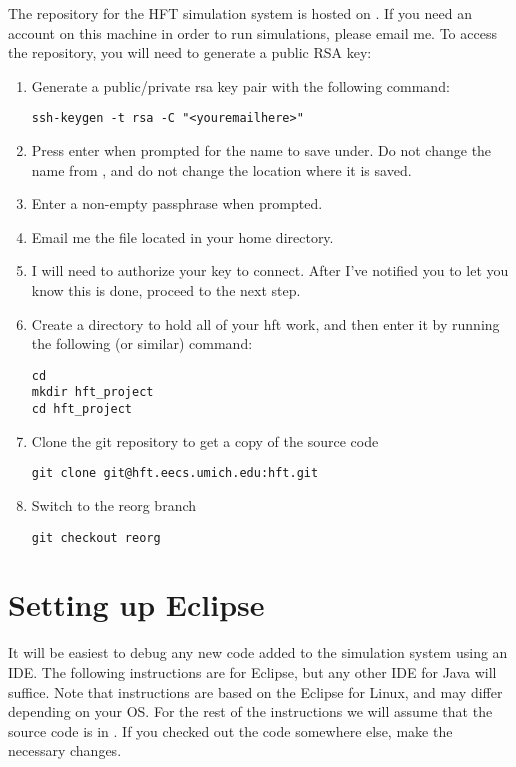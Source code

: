 \documentclass[11pt]{article}
\begin{document}
The repository for the HFT simulation system is hosted on . If
you
need an account on this machine in order to run simulations, please email me.
To access the repository, you will need to generate a public RSA key:
\begin{enumerate}
\item Generate a public/private rsa key pair with the following command:

\begin{verbatim}
ssh-keygen -t rsa -C "<youremailhere>"
\end{verbatim}

\item Press enter when prompted for the name to save under. Do not change the
  name from , and do not change the location where it is saved.
\item Enter a non-empty passphrase when prompted.
\item Email me the  file located in your home directory.
\item I will need to authorize your key to connect. After I've notified you to
  let you know this is done, proceed to the next step.
\item Create a directory to hold all of your hft work, and then enter it by
  running the following (or similar) command:

\begin{verbatim}
cd
mkdir hft_project
cd hft_project
\end{verbatim}

\item Clone the git repository to get a copy of the source code

\begin{verbatim}
git clone git@hft.eecs.umich.edu:hft.git
\end{verbatim}

\item Switch to the reorg branch

\begin{verbatim}
git checkout reorg
\end{verbatim}

\end{enumerate}

\section{Setting up Eclipse}
It will be easiest to debug any new code added to the simulation system using an
IDE. The following instructions are for Eclipse, but any other IDE for Java will
suffice. Note that instructions are based on the Eclipse for Linux, and may
differ depending on your OS. For the rest of the instructions we will assume
that the source code is in . If you checked out the code
somewhere else, make the necessary changes.
\end{document}

